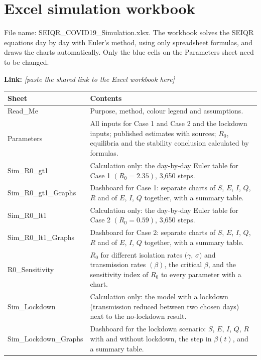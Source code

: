 \documentclass[12pt,a4paper]{article}
\theoremstyle{definition}
\begin{document}
\section{Excel simulation workbook}

File name: SEIQR\_COVID19\_Simulation.xlsx. The workbook solves the SEIQR equations day by day with Euler's method, using only spreadsheet formulas, and draws the charts automatically. Only the blue cells on the Parameters sheet need to be changed.


\textbf{Link: }\textit{[paste the shared link to the Excel workbook here]}


\begin{longtable}{>{\raggedright\arraybackslash}p{}>{\raggedright\arraybackslash}p{}}
\hline
\rowcolor[HTML]{D9E2F3}\textbf{Sheet} & \textbf{Contents} \\ \hline
\endhead
Read\_Me & Purpose, method, colour legend and assumptions. \\ \hline
Parameters & All inputs for Case 1 and Case 2 and the lockdown inputs; published estimates with sources; $R_{0}$, equilibria and the stability conclusion calculated by formulas. \\ \hline
Sim\_R0\_gt1 & Calculation only: the day-by-day Euler table for Case 1 $(R_{0} = 2.35)$, 3,650 steps. \\ \hline
Sim\_R0\_gt1\_Graphs & Dashboard for Case 1: separate charts of $S$, $E$, $I$, $Q$, $R$ and of $E$, $I$, $Q$ together, with a summary table. \\ \hline
Sim\_R0\_lt1 & Calculation only: the day-by-day Euler table for Case 2 $(R_{0} = 0.59)$, 3,650 steps. \\ \hline
Sim\_R0\_lt1\_Graphs & Dashboard for Case 2: separate charts of $S$, $E$, $I$, $Q$, $R$ and of $E$, $I$, $Q$ together, with a summary table. \\ \hline
R0\_Sensitivity & $R_{0}$ for different isolation rates $(\gamma$, $\sigma )$ and transmission rates $(\beta )$, the critical $\beta$, and the sensitivity index of $R_{0}$ to every parameter with a chart. \\ \hline
Sim\_Lockdown & Calculation only: the model with a lockdown (transmission reduced between two chosen days) next to the no-lockdown result. \\ \hline
Sim\_Lockdown\_Graphs & Dashboard for the lockdown scenario: $S$, $E$, $I$, $Q$, $R$ with and without lockdown, the step in $\beta (t)$, and a summary table. \\ \hline
\end{longtable}
\end{document}
